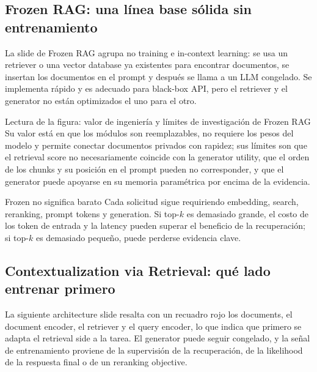 \subsection{Frozen RAG: una línea base sólida sin entrenamiento}

La slide de Frozen RAG agrupa no training e in-context learning: se usa un retriever o una vector database ya existentes para encontrar documentos, se insertan los documentos en el prompt y después se llama a un LLM congelado. Se implementa rápido y es adecuado para black-box API, pero el retriever y el generator no están optimizados el uno para el otro.


\begin{knowledgebox}{Lectura de la figura: valor de ingeniería y límites de investigación de Frozen RAG}
Su valor está en que los módulos son reemplazables, no requiere los pesos del modelo y permite conectar documentos privados con rapidez; sus límites son que el retrieval score no necesariamente coincide con la generator utility, que el orden de los chunks y su posición en el prompt pueden no corresponder, y que el generator puede apoyarse en su memoria paramétrica por encima de la evidencia.
\end{knowledgebox}

\begin{warningbox}{Frozen no significa barato}
Cada solicitud sigue requiriendo embedding, search, reranking, prompt tokens y generation. Si top-$k$ es demasiado grande, el costo de los token de entrada y la latency pueden superar el beneficio de la recuperación; si top-$k$ es demasiado pequeño, puede perderse evidencia clave.
\end{warningbox}


\subsection{Contextualization via Retrieval: qué lado entrenar primero}

La siguiente architecture slide resalta con un recuadro rojo los documents, el document encoder, el retriever y el query encoder, lo que indica que primero se adapta el retrieval side a la tarea. El generator puede seguir congelado, y la señal de entrenamiento proviene de la supervisión de la recuperación, de la likelihood de la respuesta final o de un reranking objective.

